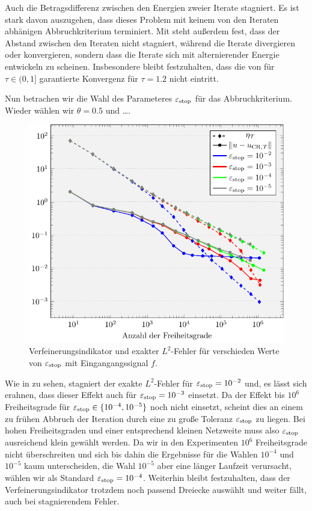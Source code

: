 Auch die Betragsdifferenz zwischen den Energien zweier Iterate stagniert.
Es ist stark davon auszugehen, dass dieses Problem mit keinem von den
Iteraten abhänigen Abbruchkriterium terminiert.
Mit  steht außerdem fest, dass der
Abstand zwischen den Iteraten nicht stagniert, während die Iterate divergieren
oder konvergieren, sondern dass die Iterate sich mit alternierender Energie
entwickeln zu scheinen.
Insbesondere bleibt festzuhalten, dass die von 
für $\tau\in(0,1]$ garantierte Konvergenz für $\tau=1.2$ nicht eintritt.

Nun betrachen wir die Wahl des Parameteres $\varepsilon_{\textup{stop}}$ für das Abbruchkriterium.
Wieder wählen wir $\theta = 0.5$ und \ldots.
\begin{figure}[p]
  \centering
  \includegraphics[width=\linewidth]
    {pictures/chapExperiments/secParameters/parEpsStop/f01/convergenceF.pdf}
  \caption{Verfeinerungsindikator und exakter $L^2$-Fehler für verschieden
  Werte von $\varepsilon_{\textup{stop}}$ mit Eingangangssignal $f$.}
  \label{fig:parEpsStopConvergence}
\end{figure}
Wie in  zu sehen, stagniert der 
exakte $L^2$-Fehler für $\varepsilon_{\textup{stop}}=10^{-2}$ und, es lässt sich erahnen, dass
dieser Effekt auch für $\varepsilon_{\textup{stop}}=10^{-3}$ einsetzt. 
Da der Effekt bis $10^6$ Freiheitsgrade für $\varepsilon_{\textup{stop}}\in\{10^{-4},10^{-5}\}$
noch nicht einsetzt, scheint dies an einem zu frühen Abbruch der Iteration 
durch eine zu große Toleranz $\varepsilon_{\textup{stop}}$ zu liegen. 
Bei hohen Freiheitsgraden und einer entsprechend kleinen Netzweite muss
also $\varepsilon_{\textup{stop}}$ ausreichend klein gewählt werden.
Da wir in den Experimenten  $10^6$ Freiheitsgrade nicht überschreiten und sich
bis dahin die Ergebnisse für die Wahlen $10^{-4}$ und $10^{-5}$ kaum
unterscheiden, die Wahl $10^{-5}$ aber eine länger Laufzeit verursacht, wählen
wir als Standard $\varepsilon_{\textup{stop}}=10^{-4}$.
Weiterhin bleibt festzuhalten, dass der Verfeinerungsindikator trotzdem noch
passend Dreiecke auswählt und weiter fällt, auch bei stagnierendem Fehler.


